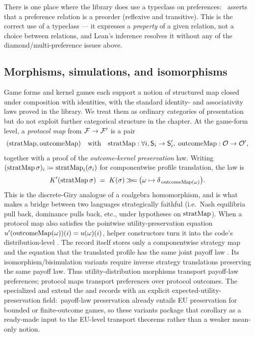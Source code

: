 There is one place where the library does use a typeclass on
preferences:\  asserts that a preference
relation is a preorder (reflexive and transitive).  This is the
correct use of a typeclass — it expresses a \emph{property} of a
given relation, not a choice between relations, and Lean's
inference resolves it without any of the diamond/multi-preference
issues above.


\subsection{Morphisms, simulations, and isomorphisms}
\label{sec:semantic-core:morphisms}

Game forms and kernel games each support a notion of structured
map closed under composition with identities, with the standard
identity- and associativity laws proved in the library.  We treat
them as ordinary categories of presentation but do not exploit
further categorical structure in the chapter.  At the game-form
level, a \emph{protocol map} from $\mathcal{F} \to \mathcal{F}'$ is a pair
\[
  (\mathrm{stratMap}, \mathrm{outcomeMap})
  \quad\text{with}\quad
  \mathrm{stratMap} : \forall i, \mathsf{S}_i \to \mathsf{S}'_i,\;
  \mathrm{outcomeMap} : \mathcal{O} \to \mathcal{O}',
\]
together with a proof of the \emph{outcome-kernel preservation} law.
Writing
$(\mathrm{stratMap}\,\sigma)_i \coloneqq \mathrm{stratMap}_i(\sigma_i)$ for
componentwise profile translation, the law is
\begin{equation}
\label{eq:protocolmap}
  K'(\mathrm{stratMap}\,\sigma) \;=\;
    K(\sigma) \mathbin{\mathbin{\gg\!=}} \bigl(\omega \mapsto \delta_{\,\mathrm{outcomeMap}(\omega)}\bigr).
\end{equation}
This is the discrete-Giry analogue of a coalgebra homomorphism,
and is what makes a bridge between two languages strategically
faithful (i.e.\ Nash equilibria pull back, dominance pulls back,
etc., under hypotheses on $\mathrm{stratMap}$).  When a protocol map also
satisfies the pointwise utility-preservation equation
$u'(\mathrm{outcomeMap}(\omega))(i)=u(\omega)(i)$, helper
constructors turn it into the code's distribution-level
.  The  record
itself stores only a componentwise strategy map and the equation
that the translated profile has the same joint payoff law
.  Its isomorphism/bisimulation variants require inverse
strategy translations preserving the same payoff law.  Thus
utility-distribution morphisms transport payoff-law preferences;
protocol maps transport preferences over protocol outcomes.  The
specialized  and  extend the
 and  records with an explicit
expected-utility-preservation field:\ payoff-law preservation already
entails EU preservation for bounded or finite-outcome games, so these
variants package that corollary as a ready-made input to the EU-level
transport theorems rather than a weaker mean-only notion.

